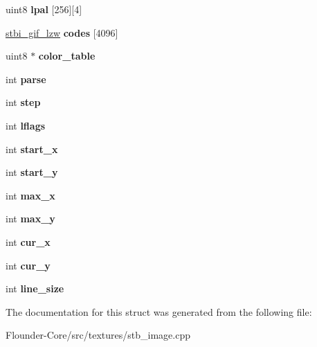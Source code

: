 \begin{DoxyCompactItemize}
\mbox{\label{structstbi__gif__struct_af2bf4a7890065ce54b8b59c6fd008e5f}} 
uint8 {\bfseries lpal} \mbox{[}256\mbox{]}\mbox{[}4\mbox{]}
\item 
\mbox{\label{structstbi__gif__struct_a4644d2fe2c84e410ab235ea415e9a740}} 
\hyperlink{structstbi__gif__lzw__struct}{stbi\+\_\+gif\+\_\+lzw} {\bfseries codes} \mbox{[}4096\mbox{]}
\item 
\mbox{\label{structstbi__gif__struct_aa10fee29a36ac4b9cae98300f839d091}} 
uint8 $\ast$ {\bfseries color\+\_\+table}
\item 
\mbox{\label{structstbi__gif__struct_a7a57ec19955875d52af26851ef332db8}} 
int {\bfseries parse}
\item 
\mbox{\label{structstbi__gif__struct_a61556e0a3ff8f19fa80401de5da1f079}} 
int {\bfseries step}
\item 
\mbox{\label{structstbi__gif__struct_a01e6981357bbd283177f70f87050a49d}} 
int {\bfseries lflags}
\item 
\mbox{\label{structstbi__gif__struct_ad3899ad3323686e963a7322e9a80bb05}} 
int {\bfseries start\+\_\+x}
\item 
\mbox{\label{structstbi__gif__struct_a7f4974b80d6e6f4f56b5fd02a9c1c121}} 
int {\bfseries start\+\_\+y}
\item 
\mbox{\label{structstbi__gif__struct_a02391438194b161d16bdf95878be6a66}} 
int {\bfseries max\+\_\+x}
\item 
\mbox{\label{structstbi__gif__struct_aff3410e0fff097d4719e54096f6da69b}} 
int {\bfseries max\+\_\+y}
\item 
\mbox{\label{structstbi__gif__struct_adbc7ae7e9ff2e2abdf66eb0e1a4b3ffb}} 
int {\bfseries cur\+\_\+x}
\item 
\mbox{\label{structstbi__gif__struct_ac61865216c4b578c235f5b8170c2036c}} 
int {\bfseries cur\+\_\+y}
\item 
\mbox{\label{structstbi__gif__struct_a5b7d7625c253025ff5ee4169afbf06b7}} 
int {\bfseries line\+\_\+size}
\end{DoxyCompactItemize}


The documentation for this struct was generated from the following file\+:\begin{DoxyCompactItemize}
\item 
Flounder-\/\+Core/src/textures/stb\+\_\+image.\+cpp\end{DoxyCompactItemize}
